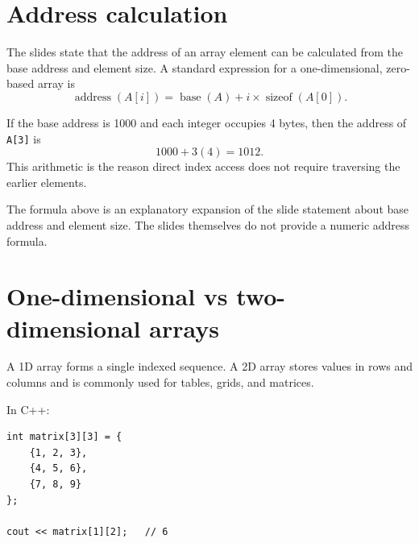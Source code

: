 \section{Address calculation}

The slides state that the address of an array element can be calculated from the base address and element size. A standard expression for a one-dimensional, zero-based array is
\[
\operatorname{address}(A[i]) = \operatorname{base}(A) + i \times \operatorname{sizeof}(A[0]).
\]

\begin{workedexample}
If the base address is 1000 and each integer occupies 4 bytes, then the address of \texttt{A[3]} is
\[
1000 + 3(4) = 1012.
\]
This arithmetic is the reason direct index access does not require traversing the earlier elements.
\end{workedexample}

\begin{clarification}
The formula above is an explanatory expansion of the slide statement about base address and element size. The slides themselves do not provide a numeric address formula.
\end{clarification}

\section{One-dimensional vs two-dimensional arrays}

A 1D array forms a single indexed sequence. A 2D array stores values in rows and columns and is commonly used for tables, grids, and matrices.

\begin{mlfigure}
\end{mlfigure}

In C++:

\begin{lstlisting}
int matrix[3][3] = {
    {1, 2, 3},
    {4, 5, 6},
    {7, 8, 9}
};

cout << matrix[1][2];   // 6
\end{lstlisting}


